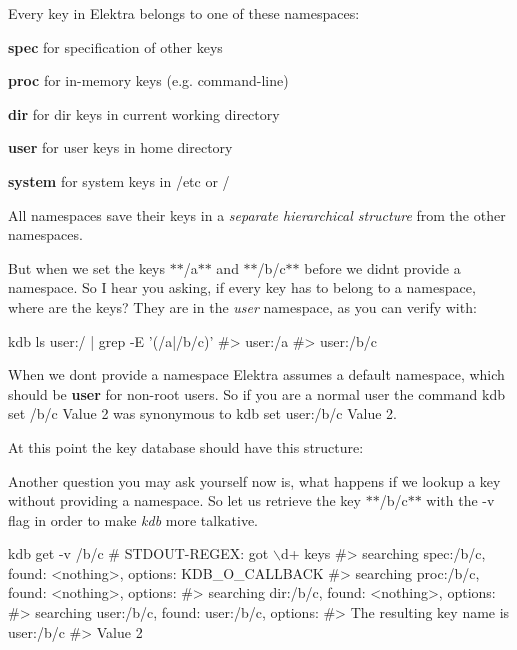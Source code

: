 Every key in Elektra belongs to one of these namespaces\+:


\begin{DoxyItemize}
\item {\bfseries spec} for specification of other keys
\item {\bfseries proc} for in-\/memory keys (e.\+g. command-\/line)
\item {\bfseries dir} for dir keys in current working directory
\item {\bfseries user} for user keys in home directory
\item {\bfseries system} for system keys in {\ttfamily /etc} or {\ttfamily /}
\end{DoxyItemize}

All namespaces save their keys in a {\itshape separate hierarchical structure} from the other namespaces.

But when we set the keys $\ast$$\ast$/a$\ast$$\ast$ and $\ast$$\ast$/b/c$\ast$$\ast$ before we didn\textquotesingle{}t provide a namespace. So I hear you asking, if every key has to belong to a namespace, where are the keys? They are in the {\itshape user} namespace, as you can verify with\+:


\begin{DoxyCode}
kdb ls user:/ | grep -E '(/a|/b/c)'
#> user:/a
#> user:/b/c
\end{DoxyCode}


When we don\textquotesingle{}t provide a namespace Elektra assumes a default namespace, which should be {\bfseries user} for non-\/root users. So if you are a normal user the command {\ttfamily kdb set /b/c \textquotesingle{}Value 2\textquotesingle{}} was synonymous to {\ttfamily kdb set user\+:/b/c \textquotesingle{}Value 2\textquotesingle{}}.

At this point the key database should have this structure\+: 

Another question you may ask yourself now is, what happens if we lookup a key without providing a namespace. So let us retrieve the key $\ast$$\ast$/b/c$\ast$$\ast$ with the -\/v flag in order to make {\itshape kdb} more talkative.


\begin{DoxyCode}
kdb get -v /b/c
# STDOUT-REGEX: got \(\backslash\)d+ keys
#>  searching spec:/b/c, found: <nothing>, options: KDB\_O\_CALLBACK
#>  searching proc:/b/c, found: <nothing>, options:
#>  searching dir:/b/c, found: <nothing>, options:
#>  searching user:/b/c, found: user:/b/c, options:
#> The resulting key name is user:/b/c
#> Value 2
\end{DoxyCode}


